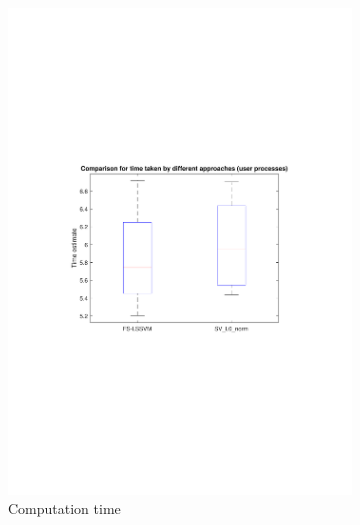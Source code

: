 \documentclass{article}
\begin{document}
            \begin{figure}[h]
             \centering
             \begin{subfigure}[b]{0.3\textwidth}
                 \centering
                 \includegraphics[width=\textwidth]{Assignment 3/figures/1_3/computation_time_comparison.pdf}
                 \caption{Computation time}
                 \label{fig:l0computation_time}
             \end{subfigure}
            \hfill
             \begin{subfigure}[b]{0.3\textwidth}
                 \centering

\end{subfigure}
\end{figure}
\end{document}

